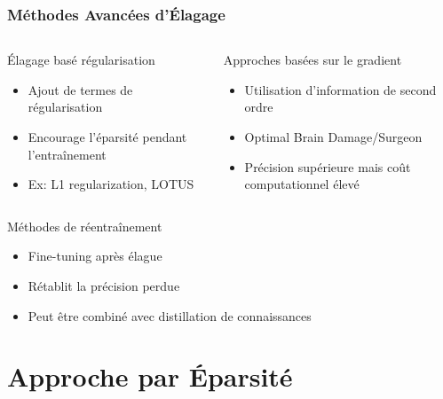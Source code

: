 \documentclass[10pt]{beamer}
\begin{document}
\begin{frame}
\frametitle{Méthodes Avancées d'Élagage}
\begin{columns}
\begin{column}{0.5\textwidth}
\begin{block}{Élagage basé régularisation}
\begin{itemize}
    \item Ajout de termes de régularisation
    \item Encourage l'éparsité pendant l'entraînement
    \item Ex: L1 regularization, LOTUS
\end{itemize}
\end{block}
\end{column}
\begin{column}{0.5\textwidth}
\begin{block}{Approches basées sur le gradient}
\begin{itemize}
    \item Utilisation d'information de second ordre
    \item Optimal Brain Damage/Surgeon
    \item Précision supérieure mais coût computationnel élevé
\end{itemize}
\end{block}
\end{column}
\end{columns}

\begin{block}{Méthodes de réentraînement}
\begin{itemize}
    \item Fine-tuning après élague
    \item Rétablit la précision perdue
    \item Peut être combiné avec distillation de connaissances
\end{itemize}
\end{block}
\end{frame}

\section{Approche par Éparsité}
\end{document}
